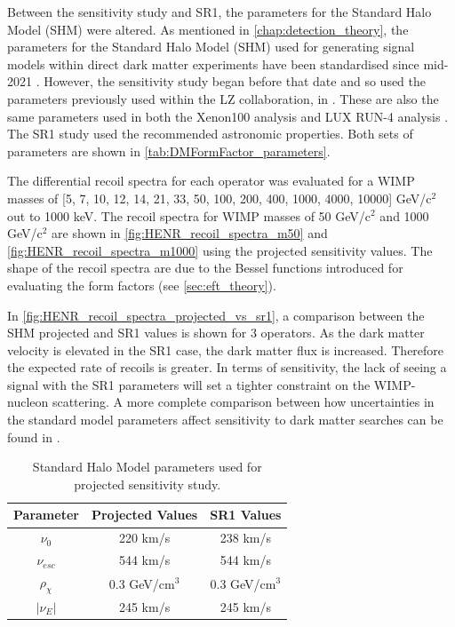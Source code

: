 \par
Between the sensitivity study and SR1, the parameters for the Standard Halo Model (SHM) were altered.
As mentioned in \autoref{chap:detection_theory}, the parameters for the Standard Halo Model (SHM) used for generating signal models within direct dark matter experiments have been standardised since mid-2021 \cite{standard_halo_model_conventions_ref}.
However, the sensitivity study began before that date and so used the parameters previously used within the LZ collaboration, in \cite{LZ_projected_sensitivity_paper_ref,LZ_TechnicalDesignReview_ref,LZ_Ibles_LZStats_Thesis_ref}.
These are also the same parameters used in both the Xenon100 analysis \cite{xenon100_eft_ref} and LUX RUN-4 analysis \cite{LUX_RUN4_EFT_2021}.
The SR1 study used the recommended astronomic properties.
Both sets of parameters are shown in \autoref{tab:DMFormFactor_parameters}.

\par
The differential recoil spectra for each operator was evaluated for a WIMP masses of [5, 7, 10, 12, 14, 21, 33, 50, 100, 200, 400, 1000, 4000, 10000] GeV/c$^{2}$ out to 1000 keV.
The recoil spectra for WIMP masses of 50 GeV/c$^2$ and 1000 GeV/c$^2$ are shown in \autoref{fig:HENR_recoil_spectra_m50} and \autoref{fig:HENR_recoil_spectra_m1000} using the projected sensitivity values.
The shape of the recoil spectra are due to the Bessel functions introduced for evaluating the form factors (see \autoref{sec:eft_theory}).

\par
In \autoref{fig:HENR_recoil_spectra_projected_vs_sr1}, a comparison between the SHM projected and SR1 values is shown for 3 operators.
As the dark matter velocity is elevated in the SR1 case, the dark matter flux is increased.
Therefore the expected rate of recoils is greater.
In terms of sensitivity, the lack of seeing a signal with the SR1 parameters will set a tighter constraint on the WIMP-nucleon scattering.
A more complete comparison between how uncertainties in the standard model parameters affect sensitivity to dark matter searches can be found in \cite{LZ_Ibles_LZStats_Thesis_ref,billyboxer_thesis_ref}.

\begin{table}[]
    \centering
    \begin{tabular}{c|c|c}
        Parameter         & Projected Values   & SR1 Values       \\ \hline
        $\nu_0$           & 220 km/s           & 238 km/s         \\ 
        $\nu_{esc}$       & 544 km/s           & 544 km/s         \\
        $\rho_{\chi}$     & 0.3 GeV/cm$^{3}$   & 0.3 GeV/cm$^{3}$ \\
        $|\nu_E|$         & 245 km/s           & 245 km/s  
    \end{tabular}
    \caption{Standard Halo Model parameters used for projected sensitivity study.}
    \label{tab:DMFormFactor_parameters}
\end{table}


